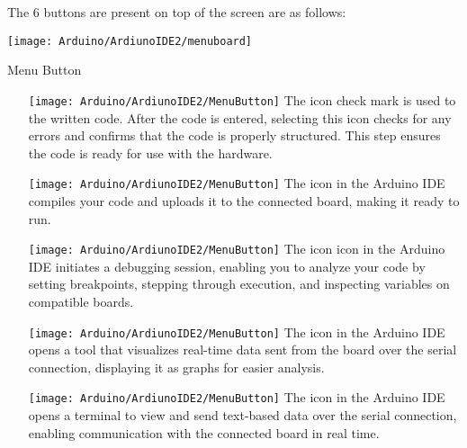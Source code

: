 \bigskip

The 6 buttons are present on top of the screen are as follows:







\begin{center}

    \texttt{[image: Arduino/ArdiunoIDE2/menuboard]}

     {Menu Button}\label{fig::Menu Button}		
\end{center}


\bigskip

\begin{itemize}
    \item[\hbox{\texttt{[image: Arduino/ArdiunoIDE2/MenuButton]}}]	The icon check mark is used to  the written code. After the code is entered, selecting this icon checks for any errors and confirms that the code is properly structured. This step ensures the code is ready for use with the hardware.
    \item[\hbox{\texttt{[image: Arduino/ArdiunoIDE2/MenuButton]}}]	The icon  in the Arduino IDE compiles your code and uploads it to the connected board, making it ready to run.
    \item[\hbox{\texttt{[image: Arduino/ArdiunoIDE2/MenuButton]}}]	The icon 
     icon in the Arduino IDE initiates a debugging session, enabling you to analyze your code by setting breakpoints, stepping through execution, and inspecting variables on compatible boards.
    
    \item[\hbox{\texttt{[image: Arduino/ArdiunoIDE2/MenuButton]}}] The icon  in the Arduino IDE opens a tool that visualizes real-time data sent from the board over the serial connection, displaying it as graphs for easier analysis.
    \item[\hbox{\texttt{[image: Arduino/ArdiunoIDE2/MenuButton]}}]	The icon  in the Arduino IDE opens a terminal to view and send text-based data over the serial connection, enabling communication with the connected board in real time.
   
\end{itemize}





